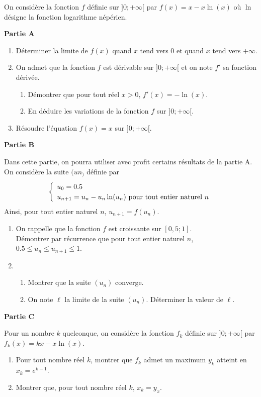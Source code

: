 \documentclass[11pt,fleqn, openany]{book} %
\begin{document}
%
\begin{exercise}[subtitle={(Métropole 2022)}]On considère la fonction $f$ définie sur $]0;+\infty[$ par $f(x)=x-x\ln(x)$ où $\ln$ désigne la fonction logarithme népérien.

\textbf{Partie A}

\begin{enumerate}
\item Déterminer la limite de $f(x)$ quand $x$ tend vers 0 et quand $x$ tend vers $+\infty$.
\item On admet que la fonction $f$ est dérivable sur $]0;+\infty[$ et on note $f'$ sa fonction dérivée.
\begin{enumerate}
\item Démontrer que pour tout réel $x>0$, $f'(x)=-\ln(x)$.
\item En déduire les variations de la fonction $f$ sur $]0;+\infty[$.
\end{enumerate}
\item Résoudre l'équation $f(x)=x$ sur $]0;+\infty[$.
\end{enumerate}

\textbf{Partie B}

Dans cette partie, on pourra utiliser avec profit certains résultats de la partie A.\\
On considère la suite $(un_)$ définie par
\[\left\{\renewcommand{\arraystretch}{1.2} \begin{array}{l}u_0=0.5 \\ u_{n+1}=u_n-u_n\ln(u_n) \text{ pour tout entier naturel }n

\end{array}\right.\]
Ainsi, pour tout entier naturel $n$, $u_{n+1}=f(u_n)$.
\begin{enumerate}
\item On rappelle que la fonction $f$ est croissante sur $[0,5;1]$.\\
Démontrer par récurrence que pour tout entier naturel $n$, $0.5\leqslant u_n \leqslant u_{n+1} \leqslant 1$.
\item \begin{enumerate}
\item Montrer que la suite $(u_n)$ converge.
\item On note $\ell$ la limite de la suite $(u_n)$. Déterminer la valeur de $\ell$.
\end{enumerate}
\end{enumerate}

\textbf{Partie C}

Pour un nombre $k$ quelconque, on considère la fonction $f_k$ définie sur $]0;+\infty[$ par $f_k(x)=kx-x\ln(x)$.
\begin{enumerate}
\item Pour tout nombre réel $k$, montrer que $f_k$ admet un maximum $y_k$ atteint en $x_k=e^{k-1}$.
\item Montrer que, pour tout nombre réel $k$, $x_k=y_x$.
\end{enumerate}\end{exercise}
\end{document}
